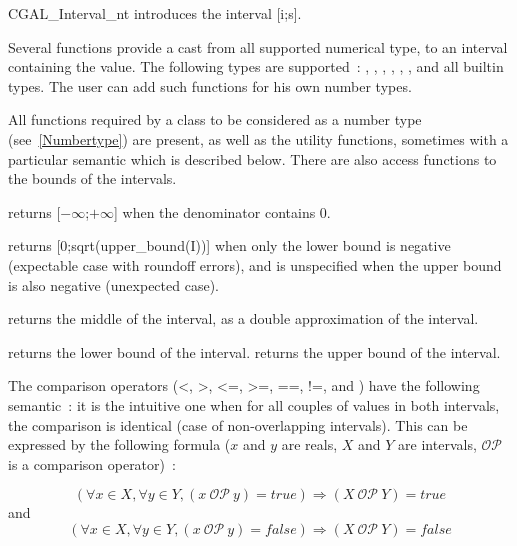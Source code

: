 \begin{ccClass} {CGAL_Interval_nt}
{introduces the interval [i;s].}

Several functions  provide a cast from all
supported numerical type, to an interval 
containing the value.  The following types are supported~: ,
, , , ,
, and all builtin types.
The user can add such functions for his own number types.


\ccOperations
{}

All functions required by a class to be considered as a {\cgal} number type
(see~\ref{Numbertype}) are present, as well as the utility functions,
sometimes with a particular semantic which is described below.  There are also
access functions to the bounds of the intervals.


 {returns
[$-\infty$;$+\infty$] when the denominator contains 0.}

 {returns
[0;sqrt(upper\_bound(I))] when only the lower bound is negative (expectable
case with roundoff errors), and is unspecified when the upper bound is also
negative (unexpected case).}

 {returns the
middle of the interval, as a double approximation of the interval.}

 {returns the lower bound of the interval.}
 {returns the upper bound of the interval.}

The comparison operators (<, >, <=, >=, ==, !=,  and
) have the following semantic~: it is the intuitive
one when for all couples of values in both intervals, the comparison
is identical (case of non-overlapping intervals).  This can be expressed
by the following formula ($x$ and $y$ are reals, $X$ and $Y$ are
intervals, $\mathcal{OP}$ is a comparison operator)~:

$$
\left(\forall x \in X, \forall y \in Y, (x\ \mathcal{OP}\ y) = true\right)
\Rightarrow (X\ \mathcal{OP}\ Y) = true
$$
and
$$
\left(\forall x \in X, \forall y \in Y, (x\ \mathcal{OP}\ y) = false\right)
\Rightarrow (X\ \mathcal{OP}\ Y) =false
$$


\end{ccClass}
